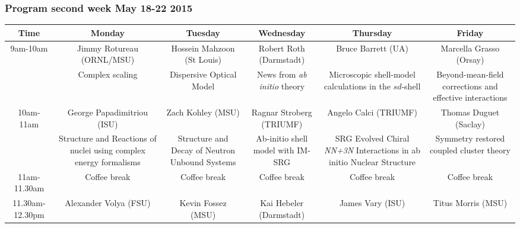 \documentclass{beamer}
\begin{document}
\begin{frame}
\frametitle{Program second week May 18-22 2015}

\begin{block}{}


{\footnotesize
\begin{tabular}{cccccc}
\hline
\multicolumn{1}{c}{ Time } & \multicolumn{1}{c}{ Monday } & \multicolumn{1}{c}{ Tuesday } & \multicolumn{1}{c}{ Wednesday } & \multicolumn{1}{c}{ Thursday } & \multicolumn{1}{c}{ Friday } \\
\hline
9am-10am        & Jimmy Rotureau (ORNL/MSU)                                         & Hossein Mahzoon (St Louis)                     & Robert Roth (Darmstadt)                                 & Bruce Barrett (UA)                                                          & Marcella Grasso (Orsay)                                  \\
                & Complex scaling                                                   & Dispersive Optical Model                       & News from \emph{ab initio} theory                       & Microscopic shell-model calculations in the $sd$-shell                      & Beyond-mean-field corrections and effective interactions \\
\hline
10am-11am       & George Papadimitriou (ISU)                                        & Zach Kohley (MSU)                              & Ragnar Stroberg (TRIUMF)                                & Angelo Calci (TRIUMF)                                                       & Thomas Duguet (Saclay)                                   \\
                & Structure and Reactions of nuclei using complex energy formalisms & Structure and Decay of Neutron Unbound Systems & Ab-initio shell model with IM-SRG                       & SRG Evolved Chiral \emph{NN+3N} Interactions in ab initio Nuclear Structure & Symmetry restored coupled cluster theory                 \\
\hline
11am-11.30am    & Coffee break                                                      & Coffee break                                   & Coffee break                                            & Coffee break                                                                & Coffee break                                             \\
\hline
11.30am-12.30pm & Alexander Volya (FSU)                                             & Kevin Fossez (MSU)                             & Kai Hebeler (Darmstadt)                                 & James Vary (ISU)                                                            & Titus Morris (MSU)                                       \\

\end{tabular}}
\end{block}
\end{frame}
\end{document}
